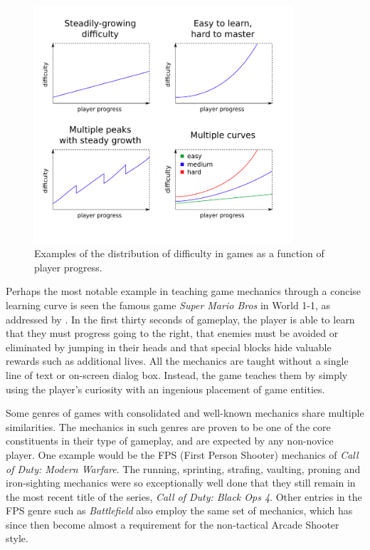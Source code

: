 \begin{figure}
    \caption{Examples of the distribution of difficulty in games as a function of player progress.}
    \begin{center}
        \includegraphics[width=26em]{figures/fig-difficulty-curves.png}
    \end{center}
    \label{fig:difficulty-curves}
\end{figure}

Perhaps the most notable example in teaching game mechanics through a concise learning curve is seen the famous game \emph{Super Mario Bros}  in World 1-1, as addressed by \citet{video_extracreditsmario11}. In the first thirty seconds of gameplay, the player is able to learn that they must progress going to the right, that enemies must be avoided or eliminated by jumping in their heads and that special blocks hide valuable rewards such as additional lives. All the mechanics are taught without a single line of text or on-screen dialog box. Instead, the game teaches them by simply using the player's curiosity with an ingenious placement of game entities.

Some genres of games with consolidated and well-known mechanics share multiple similarities. The mechanics in such genres are proven to be one of the core constituents in their type of gameplay, and are expected by any non-novice player. One example would be the FPS (First Person Shooter) mechanics of \emph{Call of Duty: Modern Warfare}. The running, sprinting, strafing, vaulting, proning and iron-sighting mechanics were so exceptionally well done that they still remain in the most recent title of the series, \emph{Call of Duty: Black Ops 4}. Other entries in the FPS genre such as \emph{Battlefield} also employ the same set of mechanics, which has since then become almost a requirement for the non-tactical Arcade Shooter style.

